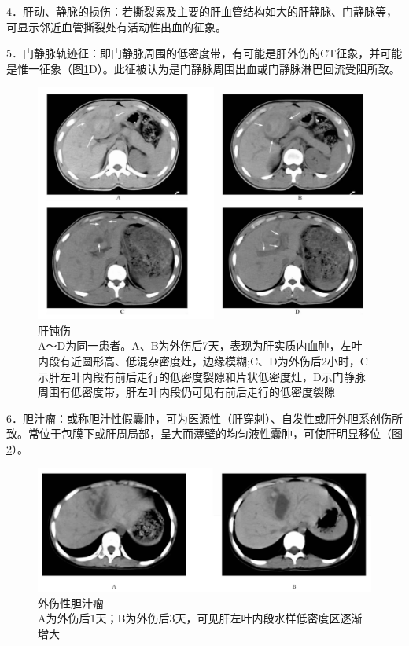 4．肝动、静脉的损伤：若撕裂累及主要的肝血管结构如大的肝静脉、门静脉等，可显示邻近血管撕裂处有活动性出血的征象。

5．门静脉轨迹征：即门静脉周围的低密度带，有可能是肝外伤的CT征象，并可能是惟一征象（图\ref{fig20-3}D）。此征被认为是门静脉周围出血或门静脉淋巴回流受阻所致。

\begin{figure}[!htbp]
 \centering
 \includegraphics[width=.7\textwidth,height=\textheight,keepaspectratio]{./images/Image00391.jpg}
 \captionsetup{justification=centering}
 \caption{肝钝伤\\{\small A～D为同一患者。A、B为外伤后7天，表现为肝实质内血肿，左叶内段有近圆形高、低混杂密度灶，边缘模糊;C、D为外伤后2小时，C示肝左叶内段有前后走行的低密度裂隙和片状低密度灶，D示门静脉周围有低密度带，肝左叶内段仍可见有前后走行的低密度裂隙}}
 \label{fig20-3}
  \end{figure} 

6．胆汁瘤：或称胆汁性假囊肿，可为医源性（肝穿刺）、自发性或肝外胆系创伤所致。常位于包膜下或肝周局部，呈大而薄壁的均匀液性囊肿，可使肝明显移位（图\ref{fig20-4}）。

\begin{figure}[!htbp]
 \centering
 \includegraphics[width=.7\textwidth,height=\textheight,keepaspectratio]{./images/Image00392.jpg}
 \captionsetup{justification=centering}
 \caption{外伤性胆汁瘤\\{\small A为外伤后1天；B为外伤后3天，可见肝左叶内段水样低密度区逐渐增大}}
 \label{fig20-4}
  \end{figure} 

